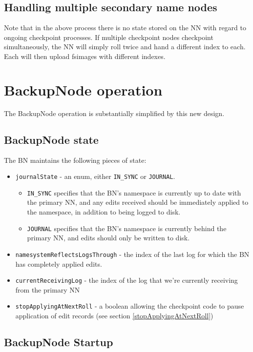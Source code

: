 \documentclass{article}
\begin{document}
\subsection{Handling multiple secondary name nodes}

Note that in the above process there is no state stored on the NN with regard to ongoing checkpoint processes. If multiple checkpoint nodes checkpoint simultaneously, the NN will simply roll twice and hand a different index to each. Each will then upload fsimages with different indexes.


\section{BackupNode operation}

The BackupNode operation is substantially simplified by this new design. 

\subsection{BackupNode state}

The BN maintains the following pieces of state:

\begin{itemize}
\item {\tt journalState} - an enum, either {\tt IN\_SYNC} or {\tt JOURNAL}.
  \begin{itemize}
  \item {\tt IN\_SYNC} specifies that the BN's namespace is currently up to date with the primary NN, and any edits received should be immediately applied to the namespace, in addition to being logged to disk.
  \item {\tt JOURNAL} specifies that the BN's namespace is currently behind the primary NN, and edits should only be written to disk.
  \end{itemize}
\item {\tt namesystemReflectsLogsThrough} - the index of the last log for which the BN has completely applied edits.
\item {\tt currentReceivingLog} - the index of the log that we're currently receiving from the primary NN
\item {\tt stopApplyingAtNextRoll} - a boolean allowing the checkpoint code to pause application of edit records (see section \ref{stopApplyingAtNextRoll})
\end{itemize}

\subsection{BackupNode Startup}
\end{document}
